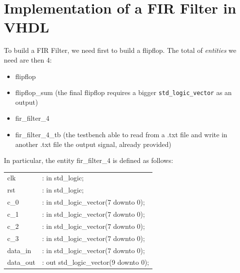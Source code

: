 \documentclass[11pt,a4paper,twocolumn]{IEEEtran}
\begin{document}
	\section{Implementation of a FIR Filter in VHDL}
		To build a FIR Filter, we need first to build a flipflop. The total of \emph{entities} we need are then 4:
		\begin{itemize}
			\item flipflop
			\item flipflop\_sum (the final flipflop requires a bigger \texttt{std\_logic\_vector} as an output)
			\item fir\_filter\_4
			\item fir\_filter\_4\_tb (the testbench able to read from a .txt file and write in another .txt file the output signal, already provided)
		\end{itemize}
		In particular, the entity fir\_filter\_4 is defined as follows:\medskip\\
		\begin{tabular}{ll}
	clk	&	 : in std\_logic; \\
	rst	&	 : in std\_logic; \\
	c\_0	&	 : in std\_logic\_vector(7 downto 0); \\
	c\_1	&	 : in std\_logic\_vector(7 downto 0); \\
	c\_2	&	 : in std\_logic\_vector(7 downto 0);\\
	c\_3	&	 : in std\_logic\_vector(7 downto 0); \\
	data\_in	&	 : in std\_logic\_vector(7 downto 0); \\
	data\_out	&	 : out std\_logic\_vector(9 downto 0); \\
		\end{tabular}
\end{document}
